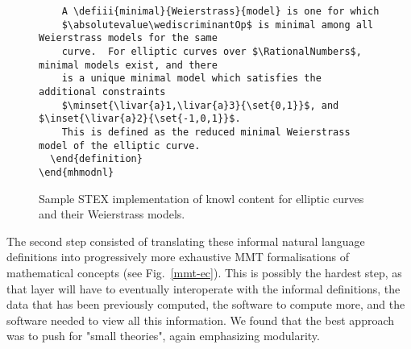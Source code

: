 \begin{figure}
\begin{verbatim}
    A \defiii{minimal}{Weierstrass}{model} is one for which
    $\absolutevalue\wediscriminantOp$ is minimal among all Weierstrass models for the same
    curve.  For elliptic curves over $\RationalNumbers$, minimal models exist, and there
    is a unique minimal model which satisfies the additional constraints
    $\minset{\livar{a}1,\livar{a}3}{\set{0,1}}$, and $\inset{\livar{a}2}{\set{-1,0,1}}$. 
    This is defined as the reduced minimal Weierstrass model of the elliptic curve.
  \end{definition}
\end{mhmodnl}
\end{verbatim}
\caption{Sample
  STEX
  implementation of \LMFDB knowl content for elliptic curves and their Weierstrass models.}
\label{stex-ec}
\end{figure}

The second step consisted of translating these informal natural language definitions into progressively more exhaustive MMT formalisations of mathematical concepts (see Fig.~\ref{mmt-ec}). This is possibly the hardest step, as that layer will have to eventually interoperate with the informal \stex definitions, the data that has been previously computed, the software to compute more, and the software needed to view all this information. We found that the best approach was to push for "small theories", again emphasizing modularity. 







